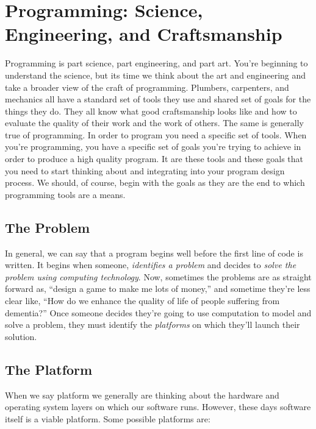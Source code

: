 \documentclass[]{tufte-handout}
\begin{document}
\section{Programming: Science, Engineering, and Craftsmanship}

Programming is part science, part engineering, and part art.  You're beginning to understand the science, but its time we think about the art and engineering and take a broader view of the craft of programming.  Plumbers, carpenters, and mechanics all have a standard set of tools they use and shared set of goals for the things they do.  They all know what good craftsmanship looks like and how to evaluate the quality of their work and the work of others. The same is generally true of programming. In order to program you need a specific set of tools. When you're programming, you have a specific set of goals you're trying to achieve in order to produce a high quality program. It are these tools and these goals that you need to start thinking about and integrating into your program design process.  We should, of course, begin with the goals as they are the end to which programming tools are a means.  

\subsection{The Problem}

In general, we can say that a program begins well before the first line of code is written.  It begins when someone, \textit{identifies a problem} and decides to \textit{solve the problem using computing technology}.  Now, sometimes the problems are as straight forward as, ``design a game to make me lots of money,'' and sometime they're less clear like, ``How do we enhance the quality of life of people suffering from dementia?''  Once someone decides they're going to use computation to model and solve a problem, they must identify the \textit{platforms} on which they'll launch their solution.


\subsection{The Platform}

When we say platform we generally are thinking about the hardware and operating system layers on which our software runs. However, these days software itself is a viable platform.  Some possible platforms are:
\end{document}
